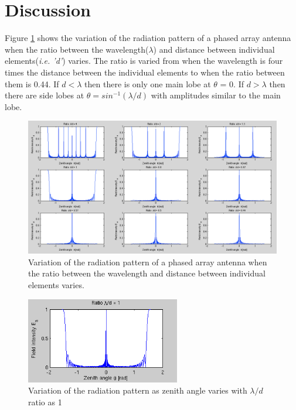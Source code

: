 \documentclass{article}
\begin{document}

\section{Discussion}

Figure \ref{fig:ratio} shows the variation of the radiation pattern of a phased array antenna when the ratio between the wavelength($\lambda$) and distance between individual elements(\textit{i.e. 'd'}) varies. The ratio is varied from when the wavelength is four times the distance between the individual elements to when the ratio between them is 0.44. If $d<\lambda$ then there is only one main lobe at $\theta $ = 0. If $d>\lambda $ then there are side lobes at $\theta = sin^{-1}(\lambda/d)$ with amplitudes similar to the main lobe.\\

\begin{figure}[htb]
\centering
\includegraphics[width=\textwidth]{Figures/ratio.png}
\caption{Variation of the radiation pattern of a phased array antenna when the ratio between the wavelength and distance between individual elements varies.}
\label{fig:ratio}
\end{figure}

\begin{figure}[h!]
\centering
\includegraphics[width=0.6\textwidth]{Figures/ratio_1.png}
\caption{Variation of the radiation pattern as zenith angle varies with $\lambda/d$ ratio as 1}
\label{fig:ratio_1}
\end{figure}
\end{document}

